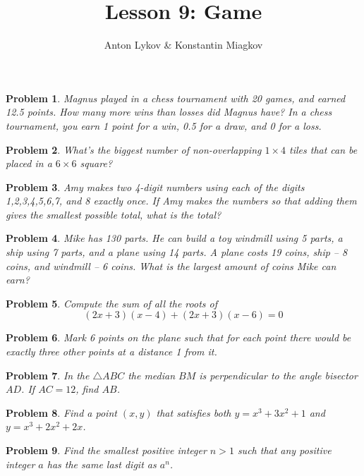 \documentclass[a4paper,12pt]{article}
\author{Anton Lykov \& Konstantin Miagkov}
\title{Lesson 9: Game}
\theoremstyle{perfect}
\newtheorem{prb}{Problem}
\begin{document}
 
\setlength{\parindent}{0cm}
\maketitle

\begin{prb}
Magnus played in a chess tournament with 20 games, and earned 12.5 points.
How many more wins than losses did Magnus have? In a chess tournament, you earn 1 point for a win, 0.5 for a draw, and 0 for a loss. 
\end{prb} 

\begin{prb}
What's the biggest number of non-overlapping $1\times 4$ tiles that can be placed in a $6\times 6$ square?
\end{prb}

\begin{prb}
Amy makes two 4-digit numbers using each of the digits 1,2,3,4,5,6,7, and 8 exactly once. If Amy makes the numbers so that adding them gives the smallest possible total, what is the total?
\end{prb} 

\begin{prb}
Mike has 130 parts. He can build a toy windmill using 5 parts, a ship using 7 parts, and a plane using 14 parts. A plane costs 19 coins, ship -- 8 coins, and windmill -- 6 coins. What is the largest amount of coins Mike can earn?
\end{prb} 

\begin{prb}
Compute the sum of all the roots of 
$$(2x+3)(x-4)+(2x+3)(x-6)=0$$
\end{prb}

\begin{prb}
Mark 6 points on the plane such that for each point there would be exactly three other points at a distance 1 from it.
\end{prb}

\begin{prb}
In the $\triangle ABC$ the median $BM$ is perpendicular to the angle bisector $AD$. If $AC = 12$, find $AB$.
\end{prb}

\begin{prb}
Find a point $(x,y)$ that satisfies both $y = x^3 + 3x^2 + 1$ and $y = x^3 + 2x^2 + 2x$.
\end{prb}

\begin{prb}
Find the smallest positive integer $n > 1$ such that any positive integer $a$ has the same last digit as $a^n$.
\end{prb}
\end{document}
